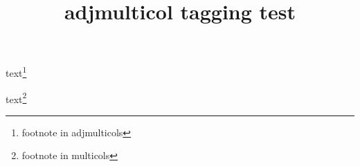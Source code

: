 \documentclass{book}
\title{adjmulticol tagging test}
\begin{document}
\kant[1]
\begin{adjmulticols}{2}{1cm}{-1cm}
\kant[2-5]
text\footnote{footnote in adjmulticols}
\end{adjmulticols}
\kant[6]

\newpage

\kant[1]
\begin{multicols}{2}
\kant[2-5]
text\footnote{footnote in multicols}
\end{multicols}
\kant[6]
\end{document}
